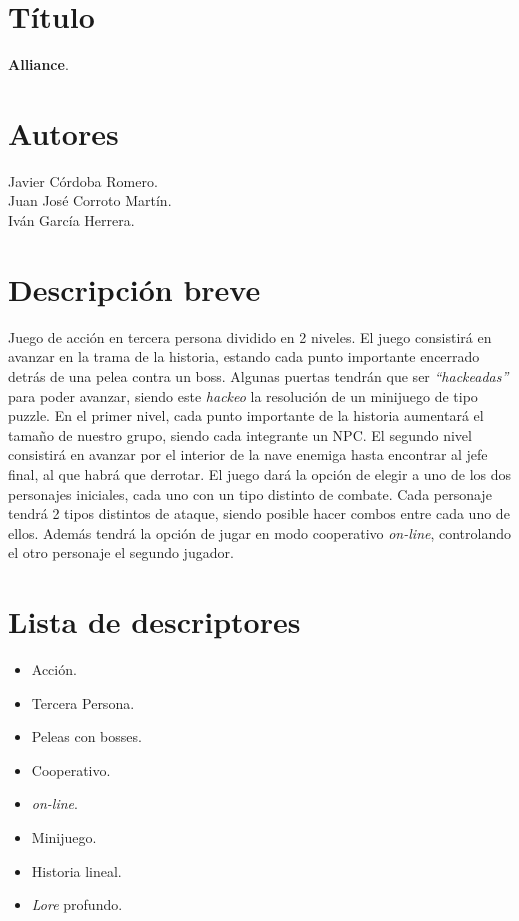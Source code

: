 \documentclass[11pt, twoside]{article}
\begin{document}
\pagestyle{insection}
\section{Título}

\textbf{Alliance}.

\pagestyle{insection}
\section{Autores}
Javier Córdoba Romero. \\
Juan José Corroto Martín. \\
Iván García Herrera.

\pagestyle{insection}
\section{Descripción breve}

Juego de acción en tercera persona dividido en 2 niveles. El juego consistirá en avanzar en la trama de la historia, estando cada punto importante encerrado detrás de una pelea contra un boss. Algunas puertas tendrán que ser \textit{``hackeadas''} para poder avanzar, siendo este \textit{hackeo} la resolución de un minijuego de tipo puzzle. En el primer nivel, cada punto importante de la historia aumentará el tamaño de nuestro grupo, siendo cada integrante un NPC. El segundo nivel consistirá en avanzar por el interior de la nave enemiga hasta encontrar al jefe final, al que habrá que derrotar. El juego dará la opción de elegir a uno de los dos personajes iniciales, cada uno con un tipo distinto de combate. Cada personaje tendrá 2 tipos distintos de ataque, siendo posible hacer combos entre cada uno de ellos. Además tendrá la opción de jugar en modo cooperativo \textit{on-line}, controlando el otro personaje el segundo jugador.

\pagestyle{insection}
\section{Lista de descriptores}
\begin{multicols}{2}
\begin{itemize}
\item Acción.
\item Tercera Persona.
\item Peleas con bosses.
\item Cooperativo.
\item \textit{on-line}.
\item Minijuego.
\item Historia lineal.
\item \textit{Lore} profundo.
\end{itemize}
\end{multicols}
\pagestyle{insection}
\end{document}
